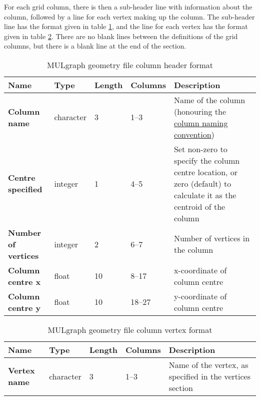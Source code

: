 For each grid column, there is then a sub-header line with information about the column, followed by a line for each vertex making up the column. The sub-header line has the format given in table \ref{tb:mulgraph_format_column_header}, and the line for each vertex has the format given in table \ref{tb:mulgraph_format_column_vertex}. There are no blank lines between the definitions of the grid columns, but there is a blank line at the end of the section.

\begin{table}[h]
  \begin{center}
    \begin{tabular}{|p{20mm}|l|l|l|p{50mm}|}
      \hline
      \textbf{Name} & \textbf{Type} & \textbf{Length} & \textbf{Columns} & \textbf{Description}\\
      \hline
      \textbf{Column name} & character & 3 & 1--3 & Name of the column (honouring the \hyperref[tb:mulgrid_conventions]{column naming convention})\\
      \hline
      \textbf{Centre specified} & integer & 1 & 4--5 & Set non-zero to specify the column centre location, or zero (default) to calculate it as the centroid of the column\\
      \hline
      \textbf{Number of vertices} & integer & 2 & 6--7 & Number of vertices in the column\\
      \hline
      \textbf{Column centre x} & float & 10 & 8--17 & x-coordinate of column centre\\
      \hline
      \textbf{Column centre y} & float & 10 & 18--27 & y-coordinate of column centre\\
      \hline
    \end{tabular}
    \caption{MULgraph geometry file column header format}
    \label{tb:mulgraph_format_column_header}
  \end{center}
\end{table}

\begin{table}[h]
  \begin{center}
    \begin{tabular}{|p{20mm}|l|l|l|p{50mm}|}
      \hline
      \textbf{Name} & \textbf{Type} & \textbf{Length} & \textbf{Columns} & \textbf{Description}\\
      \hline
      \textbf{Vertex name} & character & 3 & 1--3 & Name of the vertex, as specified in the vertices section\\
      \hline
    \end{tabular}
    \caption{MULgraph geometry file column vertex format}
    \label{tb:mulgraph_format_column_vertex}
  \end{center}
\end{table}

